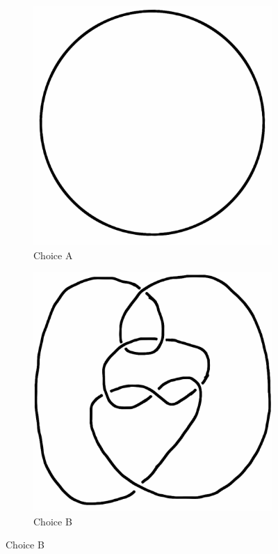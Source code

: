 \documentclass[12pt,letterpaper]{article}
\theoremstyle{definition}
\begin{document}
\begin{figure}[h!]
    \begin{subfigure}[b]{0.4\textwidth}
        \includegraphics[width=\textwidth]{meeting06pics/9SeptQ5a.png}
        \caption{Choice A}
    \end{subfigure}
    \hspace{2cm}
    \begin{subfigure}[b]{0.4\textwidth}
        \includegraphics[width=\textwidth]{meeting06pics/9SeptQ5b.png}
        \caption{Choice B}
    \end{subfigure}
\end{figure}
\end{document}
